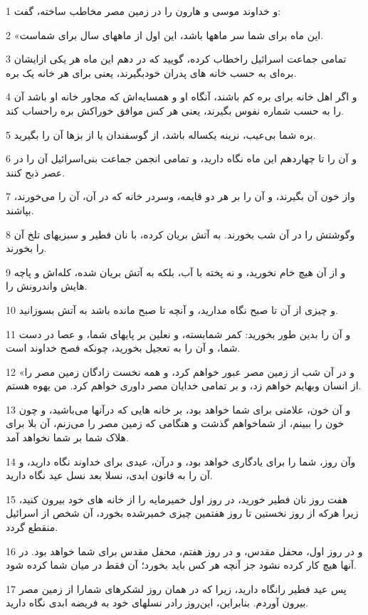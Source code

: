 \par 1 و خداوند موسی و هارون را در زمین مصر مخاطب ساخته، گفت:
\par 2 «این ماه برای شما سر ماهها باشد، این اول از ماههای سال برای شماست.
\par 3 تمامی جماعت اسرائیل راخطاب کرده، گویید که در دهم این ماه هر یکی ازایشان بره‌ای به حسب خانه های پدران خودبگیرند، یعنی برای هر خانه یک بره.
\par 4 و اگر اهل خانه برای بره کم باشند، آنگاه او و همسایه‌اش که مجاور خانه او باشد آن را به حسب شماره نفوس بگیرند، یعنی هر کس موافق خوراکش بره راحساب کند.
\par 5 بره شما بی‌عیب، نرینه یکساله باشد، از گوسفندان یا از بزها آن را بگیرید.
\par 6 و آن را تا چهاردهم این ماه نگاه دارید، و تمامی انجمن جماعت بنی‌اسرائیل آن را در عصر ذبح کنند.
\par 7 واز خون آن بگیرند، و آن را بر هر دو قایمه، وسردر خانه که در آن، آن را می‌خورند، بپاشند.
\par 8 وگوشتش را در آن شب بخورند. به آتش بریان کرده، با نان فطیر و سبزیهای تلخ آن را بخورند.
\par 9 و از آن هیچ خام نخورید، و نه پخته با آب، بلکه به آتش بریان شده، کله‌اش و پاچه هایش واندرونش را.
\par 10 و چیزی از آن تا صبح نگاه مدارید، و آنچه تا صبح مانده باشد به آتش بسوزانید.
\par 11 و آن را بدین طور بخورید: کمر شمابسته، و نعلین بر پایهای شما، و عصا در دست شما، و آن را به تعجیل بخورید، چونکه فصح خداوند است.
\par 12 «و در آن شب از زمین مصر عبور خواهم کرد، و همه نخست زادگان زمین مصر را از انسان وبهایم خواهم زد، و بر تمامی خدایان مصر داوری خواهم کرد. من یهوه هستم.
\par 13 و آن خون، علامتی برای شما خواهد بود، بر خانه هایی که درآنها می‌باشید، و چون خون را ببینم، از شماخواهم گذشت و هنگامی که زمین مصر را می‌زنم، آن بلا برای هلاک شما بر شما نخواهد آمد.
\par 14 وآن روز، شما را برای یادگاری خواهد بود، و درآن، عیدی برای خداوند نگاه دارید، و آن را به قانون ابدی، نسلا بعد نسل عید نگاه دارید.
\par 15 هفت روز نان فطیر خورید، در روز اول خمیرمایه را از خانه های خود بیرون کنید، زیرا هر‌که از روز نخستین تا روز هفتمین چیزی خمیرشده بخورد، آن شخص از اسرائیل منقطع گردد.
\par 16 و در روز اول، محفل مقدس، و در روز هفتم، محفل مقدس برای شما خواهد بود. در آنها هیچ کار کرده نشود جز آنچه هر کس باید بخورد؛ آن فقط در میان شما کرده شود.
\par 17 پس عید فطیر رانگاه دارید، زیرا که در همان روز لشکرهای شمارا از زمین مصر بیرون آوردم. بنابراین، این‌روز رادر نسلهای خود به فریضه ابدی نگاه دارید.
